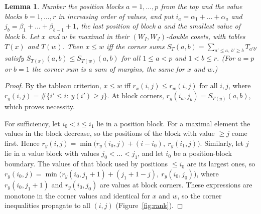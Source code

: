 \documentclass[11pt]{amsart}
\newtheorem{lemma}[theorem]{Lemma}
\theoremstyle{definition}
\theoremstyle{remark}
\begin{document}
\begin{lemma}\label{lem:corner}
Number the position blocks $a=1,\dots,p$ from the top and the value blocks $b=1,\dots,r$ in increasing order of values, and put $i_a=\alpha_1+\dots+\alpha_a$ and $j_b=\beta_1+\dots+\beta_{b-1}+1$, the last position of block $a$ and the smallest value of block $b$. Let $x$ and $w$ be maximal in their $(W_I,W_J)$-double cosets, with tables $T(x)$ and $T(w)$. Then $x\le w$ iff the corner sums $S_T(a,b)=\sum_{a'\le a,\ b'\ge b}T_{a'b'}$ satisfy $S_{T(x)}(a,b)\le S_{T(w)}(a,b)$ for all $1\le a<p$ and $1<b\le r$. (For $a=p$ or $b=1$ the corner sum is a sum of margins, the same for $x$ and $w$.)
\end{lemma}

\begin{proof}
By the tableau criterion, $x\le w$ iff $r_x(i,j)\le r_w(i,j)$ for all $i,j$, where $r_y(i,j)=\#\{i'\le i:\ y(i')\ge j\}$. At block corners, $r_y(i_a,j_b)=S_{T(y)}(a,b)$, which proves necessity.

For sufficiency, let $i_0<i\le i_1$ lie in a position block. For a maximal element the values in the block decrease, so the positions of the block with value $\ge j$ come first. Hence $r_y(i,j)=\min\bigl(r_y(i_0,j)+(i-i_0),\ r_y(i_1,j)\bigr)$. Similarly, let $j$ lie in a value block with values $j_0<\dots<j_1$, and let $i_0$ be a position-block boundary. The values of that block used by positions $\le i_0$ are its largest ones, so $r_y(i_0,j)=\min\bigl(r_y(i_0,j_1+1)+(j_1+1-j),\ r_y(i_0,j_0)\bigr)$, where $r_y(i_0,j_1+1)$ and $r_y(i_0,j_0)$ are values at block corners. These expressions are monotone in the corner values and identical for $x$ and $w$, so the corner inequalities propagate to all $(i,j)$ (Figure~\ref{fig:rank}).
\end{proof}
\end{document}
